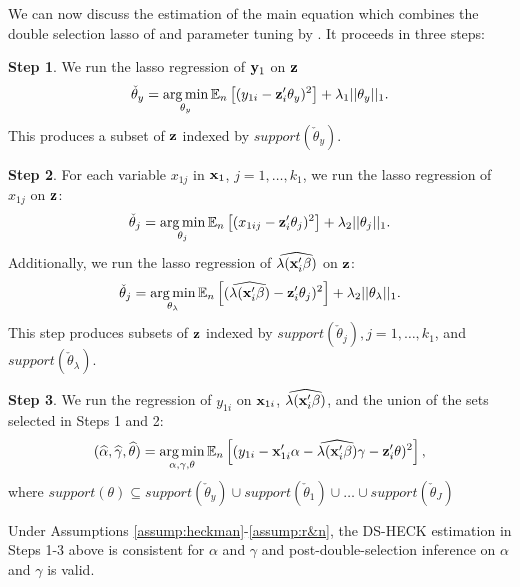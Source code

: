 \documentclass[11pt]{article}
\begin{document}
We can now discuss the estimation of the main equation which combines the double selection lasso of \cite{bellonichernozhukovhansen2014} and parameter tuning by \cite{drukker/liu:22}. It proceeds in three steps: 
\begin{description}

	\item{\bf Step 1}. We run the lasso regression of $\mathbf{y}_1$ on $\mathbf{z}$
	\begin{align*}
		\check{\theta}_y = \operatorname*{arg\,min}_{\theta_y} \mathbb{E}_n\left[(y_{1i} - \mathbf{z}_i'\theta_y)^2\right] 
		+ \lambda_1 ||\mathbb{\theta}_y||_1.
	\end{align*}
%
This produces a subset of $\mathbf{z}$ indexed by $support(\check{\theta}_y)$.
	\item{\bf Step 2}.
	For each variable $x_{1j}$ in $\mathbf{x}_1$, $j=1, \ldots, k_1$, we run the lasso regression of $x_{1j}$ on $\mathbf{z}$:
	\begin{align*}
		\check{\theta}_j = \operatorname*{arg\,min}_{\theta_j} \mathbb{E}_n\left[(x_{1ij} - \mathbf{z}_i'\theta_j)^2\right] 
		+ \lambda_2 ||\theta_j||_1.
	\end{align*}
	Additionally, we run the lasso regression of $\widehat{\lambda(\mathbf{x}_i'\mathbf{\beta})}$ on $\mathbf{z}$:
	\begin{align*}
		\check{\theta}_j = \operatorname*{arg\,min}_{\theta_\lambda} \mathbb{E}_n\left[(\widehat{\lambda(\mathbf{x}_i'\mathbf{\beta})} - \mathbf{z}_i'\theta_j)^2\right] 
		+ \lambda_2 ||\theta_\lambda||_1.
	\end{align*}	
This step produces subsets of $\mathbf{z}$ indexed by $support(\check{\theta}_j), j=1, \ldots, k_1$, and  $support(\check{\theta}_\lambda)$.	
%
	\item{\bf Step 3}. We run the regression of $y_{1i}$ on $\mathbf{x}_{1i}$, $\widehat{\lambda(\mathbf{x}_i'\mathbf{\beta})}$, and the union of the sets selected in Steps 1 and 2:
	\begin{align*}
	(\widehat{\alpha}, \widehat{\gamma}, \widehat{\theta})
	=
	\operatorname*{arg\,min}_{\alpha, \gamma, \theta} \mathbb{E}_n \left[(y_{1i} - \mathbf{x}_{1i}'\alpha - 
		\widehat{\lambda(\mathbf{x}_i'{\mathbf{\beta}})}\gamma 
		- {\mathbf{z}}_i'\theta)^2\right],
	\end{align*}
	where $support(\theta) \subseteq support(\check{\theta}_y) \cup 
	support(\check{\theta}_1)
	\cup
	\ldots \cup
	support(\check{\theta}_J)
	$

\end{description}


\begin{prop}\label{prop:heckit}
Under Assumptions \ref{assump:heckman}-\ref{assump:r&n}, the %
DS-HECK estimation in Steps 1-3 above is consistent for $\alpha$ and $\gamma$ and 
post-double-selection inference on $\alpha$ and $\gamma$ is valid.
\end{prop}
\end{document}
